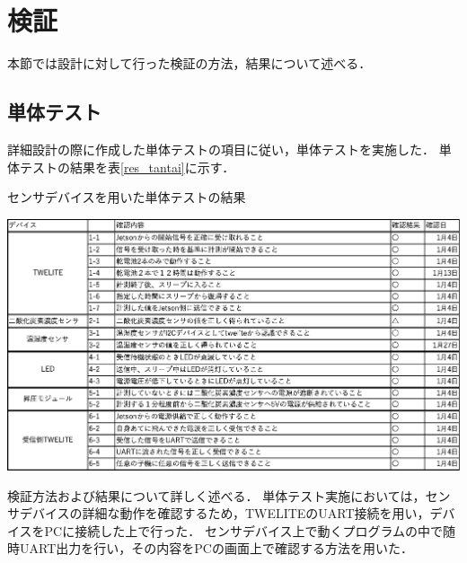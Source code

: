 

\section{検証}

本節では設計に対して行った検証の方法，結果について述べる．

\subsection{単体テスト}

詳細設計の際に作成した単体テストの項目に従い，単体テストを実施した．
単体テストの結果を表\ref{res_tantai}に示す．
\begin{table}[htbp]
    \centering
    \caption{センサデバイスを用いた単体テストの結果}
    \label{res_tantai}
    \includegraphics[width = 15cm]{./picture/tantaitest_twelite_kekka.eps}
\end{table}

検証方法および結果について詳しく述べる．
単体テスト実施においては，センサデバイスの詳細な動作を確認するため，TWELITEのUART接続を用い，デバイスをPCに接続した上で行った．
センサデバイス上で動くプログラムの中で随時UART出力を行い，その内容をPCの画面上で確認する方法を用いた．

